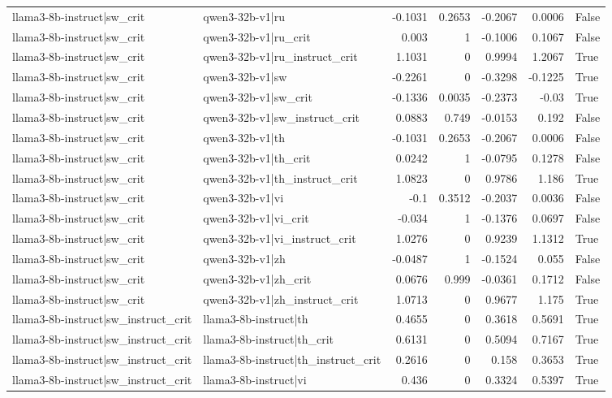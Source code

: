 \begin{table}
\begin{tabular}{l l r r r r l}
llama3-8b-instruct|sw_crit & qwen3-32b-v1|ru & -0.1031 & 0.2653 & -0.2067 & 0.0006 & False \\
llama3-8b-instruct|sw_crit & qwen3-32b-v1|ru_crit & 0.003 & 1 & -0.1006 & 0.1067 & False \\
llama3-8b-instruct|sw_crit & qwen3-32b-v1|ru_instruct_crit & 1.1031 & 0 & 0.9994 & 1.2067 & True \\
llama3-8b-instruct|sw_crit & qwen3-32b-v1|sw & -0.2261 & 0 & -0.3298 & -0.1225 & True \\
llama3-8b-instruct|sw_crit & qwen3-32b-v1|sw_crit & -0.1336 & 0.0035 & -0.2373 & -0.03 & True \\
llama3-8b-instruct|sw_crit & qwen3-32b-v1|sw_instruct_crit & 0.0883 & 0.749 & -0.0153 & 0.192 & False \\
llama3-8b-instruct|sw_crit & qwen3-32b-v1|th & -0.1031 & 0.2653 & -0.2067 & 0.0006 & False \\
llama3-8b-instruct|sw_crit & qwen3-32b-v1|th_crit & 0.0242 & 1 & -0.0795 & 0.1278 & False \\
llama3-8b-instruct|sw_crit & qwen3-32b-v1|th_instruct_crit & 1.0823 & 0 & 0.9786 & 1.186 & True \\
llama3-8b-instruct|sw_crit & qwen3-32b-v1|vi & -0.1 & 0.3512 & -0.2037 & 0.0036 & False \\
llama3-8b-instruct|sw_crit & qwen3-32b-v1|vi_crit & -0.034 & 1 & -0.1376 & 0.0697 & False \\
llama3-8b-instruct|sw_crit & qwen3-32b-v1|vi_instruct_crit & 1.0276 & 0 & 0.9239 & 1.1312 & True \\
llama3-8b-instruct|sw_crit & qwen3-32b-v1|zh & -0.0487 & 1 & -0.1524 & 0.055 & False \\
llama3-8b-instruct|sw_crit & qwen3-32b-v1|zh_crit & 0.0676 & 0.999 & -0.0361 & 0.1712 & False \\
llama3-8b-instruct|sw_crit & qwen3-32b-v1|zh_instruct_crit & 1.0713 & 0 & 0.9677 & 1.175 & True \\
llama3-8b-instruct|sw_instruct_crit & llama3-8b-instruct|th & 0.4655 & 0 & 0.3618 & 0.5691 & True \\
llama3-8b-instruct|sw_instruct_crit & llama3-8b-instruct|th_crit & 0.6131 & 0 & 0.5094 & 0.7167 & True \\
llama3-8b-instruct|sw_instruct_crit & llama3-8b-instruct|th_instruct_crit & 0.2616 & 0 & 0.158 & 0.3653 & True \\
llama3-8b-instruct|sw_instruct_crit & llama3-8b-instruct|vi & 0.436 & 0 & 0.3324 & 0.5397 & True \\

\end{tabular}
\end{table}
